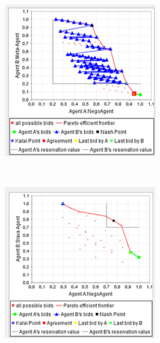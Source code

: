 \documentclass[html]{report}    %
\begin{document}
\begin{figure}
\begin{minipage}{.3\textwidth}
  \label{fig:2}
\end{minipage}
\begin{minipage}{.3\textwidth}
  \centering
  \includegraphics[width=.9\linewidth]{3}
  \label{fig:3}
\end{minipage} \\
\begin{minipage}{.3\textwidth}
  \centering
  \includegraphics[width=.9\linewidth]{4}

\end{minipage}
\end{figure}
\end{document}
